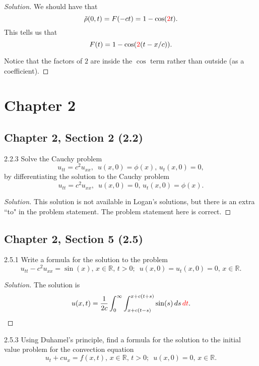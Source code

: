 \documentclass[11pt]{article}
\newenvironment{solution}
  {\renewcommand\qedsymbol{$\blacksquare$}\begin{proof}[Solution]}
  {\end{proof}}
\theoremstyle{definition}
\begin{document}
\begin{solution}
We should have that \[\tilde{\rho}(0,t) = F(-ct) = 1- \cos(\textcolor{red}{2}t).\] This tells us that \[F(t) = 1-\cos(\textcolor{red}{2}(t - x/c)). \]

Notice that the factors of $2$ are inside the $\cos$ term rather than outside (as a coefficient).
\end{solution}

\newpage

\section{Chapter 2}

\setcounter{subsection}{1}
\subsection{Chapter 2, Section 2 (2.2)}
\begin{exercise}{2.2.3}
Solve the Cauchy problem
\[ u_{tt} = c^2u_{xx}, \, \, \, u(x, 0)=\phi(x), \, u_t(x, 0) = 0,\]
by differentiating the solution to the Cauchy problem
\[ u_{tt} = c^2u_{xx}, \, \, \, u(x, 0)= 0, \, u_t(x, 0) = \phi(x).\]
\end{exercise}

\begin{solution}
This solution is not available in Logan's solutions, but there is an extra ``to" in the problem statement. The problem statement here is correct.
\end{solution}

\setcounter{subsection}{4}
\subsection{Chapter 2, Section 5 (2.5)}

\begin{exercise}{2.5.1}
Write a formula for the solution to the problem  \[u_{tt} - c^2u_{xx} = \sin(x), \, x \in \mathbb{R}, \, t>0; \, \, \, u(x,0)= u_t(x, 0) = 0, \, x \in \mathbb{R}.\]
  \end{exercise}
  
  
\begin{solution}
  The solution is \[ u(x, t) = \frac{1}{2c} \int_0^{\infty} \int_{x+c(t-s)}^{x+c(t+s)} \sin(s) \, ds \, \textcolor{red}{dt}. \]
\end{solution}

\begin{exercise}{2.5.3}
Using Duhamel's principle, find a formula for the solution to the initial value problem for the convection equation
\[u_t +cu_x =f(x,t), \, x \in \mathbb{R}, \, t>0; \, \, \, u(x,0)=0, \, x \in \mathbb{R}.\]
\end{exercise}
\end{document}
